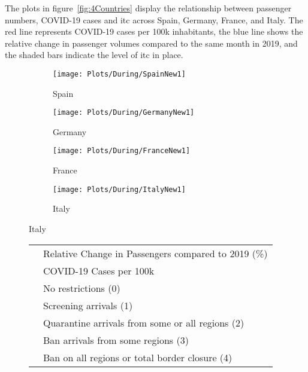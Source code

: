 \documentclass[12pt,onehalfspacing,headsepline,oneside,openright,a4paper, fleqn]{report}
\begin{document}
\newpage



The plots in figure~\ref{fig:4Countries} display the relationship between passenger numbers, COVID-19 cases and \gls{itc} across Spain, Germany, France, and Italy. The red line represents COVID-19 cases per 100k inhabitants, the blue line shows the relative change in passenger volumes compared to the same month in 2019, and the shaded bars indicate the level of \gls{itc} in place.


\begin{figure}[H]
    \centering
    \caption{Impact of COVID-19 on Air Passengers in Selected Countries (2020-2024)}
    \label{fig:4Countries}
    \begin{subfigure}[t]{0.49\textwidth}
        \centering
        \texttt{[image: Plots/During/SpainNew1]}
        \caption{Spain}
        \label{fig:Spain}
    \end{subfigure}
    \hfill
    \begin{subfigure}[t]{0.49\textwidth}
        \centering
        \texttt{[image: Plots/During/GermanyNew1]}
        \caption{Germany}
        \label{fig:Germany}
    \end{subfigure}
    
    \vspace{0.5cm}
    
    \begin{subfigure}[t]{0.49\textwidth}
        \centering
        \texttt{[image: Plots/During/FranceNew1]}
        \caption{France}
        \label{fig:France}
    \end{subfigure}
    \hfill
    \begin{subfigure}[t]{0.49\textwidth}
        \centering
        \texttt{[image: Plots/During/ItalyNew1]}
        \caption{Italy}
        \label{fig:Italy}
    \end{subfigure}
\end{figure}


\setlength{\fboxsep}{0pt}
\setlength{\fboxrule}{0.5pt}


\begin{figure}[H]
\centering
\begin{tabular}{c l}
\fbox{\textcolor{blueColor}{\rule{1em}{1em}}} & Relative Change in Passengers compared to 2019 (\%) \\[5pt]
\fbox{\textcolor{redColor}{\rule{1em}{1em}}} & COVID-19 Cases per 100k \\[5pt]
\fbox{\textcolor{brown0}{\rule{1em}{1em}}} & No restrictions (0) \\[5pt]
\fbox{\textcolor{brown1}{\rule{1em}{1em}}} & Screening arrivals (1) \\[5pt]
\fbox{\textcolor{brown2}{\rule{1em}{1em}}} & Quarantine arrivals from some or all regions (2) \\[5pt]
\fbox{\textcolor{brown3}{\rule{1em}{1em}}} & Ban arrivals from some regions (3) \\[5pt]
\fbox{\textcolor{brown4}{\rule{1em}{1em}}} & Ban on all regions or total border closure (4) \\[5pt]
\end{tabular}
\end{figure}
\end{document}
